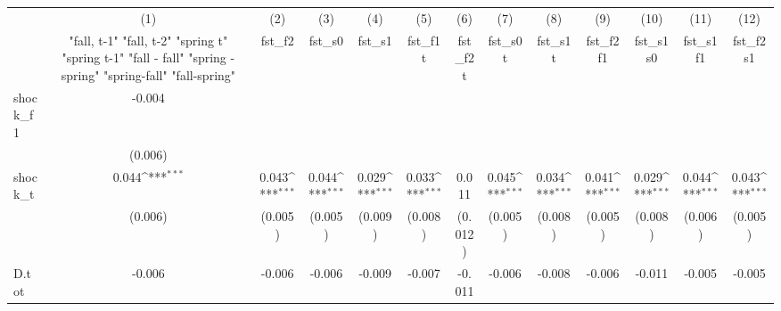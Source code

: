 {
\def\sym#1{\ifmmode^{#1}\else\(^{#1}\)\fi}
\begin{tabular}{l*{12}{c}}
\toprule
            &\multicolumn{1}{c}{(1)}&\multicolumn{1}{c}{(2)}&\multicolumn{1}{c}{(3)}&\multicolumn{1}{c}{(4)}&\multicolumn{1}{c}{(5)}&\multicolumn{1}{c}{(6)}&\multicolumn{1}{c}{(7)}&\multicolumn{1}{c}{(8)}&\multicolumn{1}{c}{(9)}&\multicolumn{1}{c}{(10)}&\multicolumn{1}{c}{(11)}&\multicolumn{1}{c}{(12)}\\
            &\multicolumn{1}{c}{  "fall, t-1" "fall, t-2" "spring t" "spring t-1"  "fall - fall" "spring - spring" "spring-fall" "fall-spring" }&\multicolumn{1}{c}{fst\_f2}&\multicolumn{1}{c}{fst\_s0}&\multicolumn{1}{c}{fst\_s1}&\multicolumn{1}{c}{fst\_f1t}&\multicolumn{1}{c}{fst\_f2t}&\multicolumn{1}{c}{fst\_s0t}&\multicolumn{1}{c}{fst\_s1t}&\multicolumn{1}{c}{fst\_f2f1}&\multicolumn{1}{c}{fst\_s1s0}&\multicolumn{1}{c}{fst\_s1f1}&\multicolumn{1}{c}{fst\_f2s1}\\
\midrule
shock\_f1    &      -0.004         &                     &                     &                     &                     &                     &                     &                     &                     &                     &                     &                     \\
            &     (0.006)         &                     &                     &                     &                     &                     &                     &                     &                     &                     &                     &                     \\
\addlinespace
shock\_t     &       0.044\sym{***}&       0.043\sym{***}&       0.044\sym{***}&       0.029\sym{***}&       0.033\sym{***}&       0.011         &       0.045\sym{***}&       0.034\sym{***}&       0.041\sym{***}&       0.029\sym{***}&       0.044\sym{***}&       0.043\sym{***}\\
            &     (0.006)         &     (0.005)         &     (0.005)         &     (0.009)         &     (0.008)         &     (0.012)         &     (0.005)         &     (0.008)         &     (0.005)         &     (0.008)         &     (0.006)         &     (0.005)         \\
\addlinespace
D.tot       &      -0.006         &      -0.006         &      -0.006         &      -0.009         &      -0.007         &      -0.011         &      -0.006         &      -0.008         &      -0.006         &      -0.011         &      -0.005         &      -0.005         \\

\end{tabular}}
